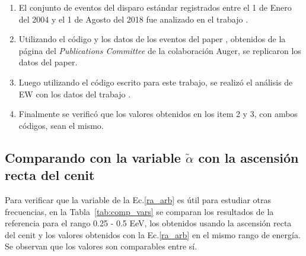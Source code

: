 \begin{enumerate}
    \item El conjunto de eventos del disparo estándar registrados entre el 1 de Enero del 2004 y el 1 de Agosto del 2018 fue analizado en el trabajo \cite{Aab_2020}.
    \item Utilizando el código y los datos de los eventos del paper \cite{Aab_2020}, obtenidos de la página del \emph{Publications Committee} de la colaboración Auger, se replicaron los datos del paper. 
    \item Luego utilizando el código escrito para este trabajo, se realizó el análisis de EW con los datos del trabajo \cite{Aab_2020}. 
    \item Finalmente se verificó que los valores obtenidos en los item 2 y 3, con  ambos códigos, sean el mismo.
\end{enumerate}

\subsection{Comparando con la variable $\tilde{\alpha}$ con la ascensión recta del cenit }

Para verificar que la variable de la Ec.\ref{ra_arb} es útil para estudiar otras frecuencias, en la Tabla~\ref{tab:comp_vars} se comparan los resultados de la referencia para el rango 0.25 - 0.5 EeV, los obtenidos usando la ascensión recta del cenit y los valores obtenidos con la Ec.\ref{ra_arb} en el mismo rango de energía. Se observan que los valores son comparables entre sí.

